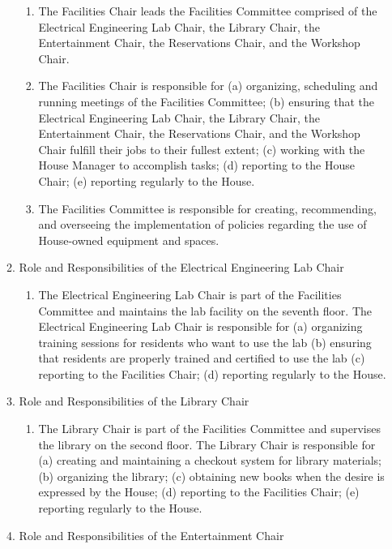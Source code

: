 \documentclass[letterpaper]{article}
\begin{document}
\begin{enumerate}
\begin{enumerate}
\begin{enumerate}
\item The Facilities Chair leads the Facilities Committee comprised of
the Electrical Engineering Lab Chair, the Library Chair, the
Entertainment Chair, the Reservations Chair, and the Workshop Chair. 
\item The Facilities Chair is responsible for (a) organizing, scheduling
and running meetings of the Facilities Committee; (b) ensuring that the
Electrical Engineering Lab Chair, the Library Chair, the Entertainment
Chair, the Reservations Chair, and the Workshop Chair fulfill their
jobs to their fullest extent; (c) working with the House Manager to
accomplish tasks; (d) reporting to the House Chair; (e) reporting
regularly to the House. 
\item The Facilities Committee is responsible for creating,
recommending, and overseeing the implementation of policies regarding
the use of House-owned equipment and spaces.
\end{enumerate}
\item Role and Responsibilities of the Electrical Engineering Lab Chair

\begin{enumerate}
\item The Electrical Engineering Lab Chair is part of the Facilities
Committee and maintains the lab facility on the seventh floor. The
Electrical Engineering Lab Chair is responsible for (a) organizing
training sessions for residents who want to use the lab (b) ensuring
that residents are properly trained and certified to use the lab (c)
reporting to the Facilities Chair; (d) reporting regularly to the
House.
\end{enumerate}
\item Role and Responsibilities of the Library Chair

\begin{enumerate}
\item The Library Chair is part of the Facilities Committee and
supervises the library on the second floor. The Library Chair is
responsible for (a) creating and maintaining a checkout system for
library materials; (b) organizing the library; (c) obtaining new books
when the desire is expressed by the House; (d) reporting to the
Facilities Chair; (e) reporting regularly to the House.
\end{enumerate}
\item Role and Responsibilities of the Entertainment Chair 


\end{enumerate}
\end{enumerate}
\end{document}
